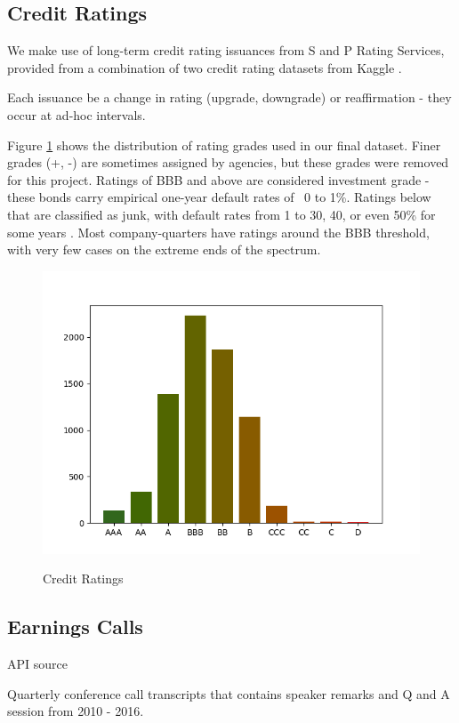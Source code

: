 \documentclass{article}
\begin{document}
    \subsection*{Credit Ratings}

    We make use of long-term credit rating issuances from S and P Rating Services, provided from a combination of two credit rating datasets from Kaggle \citep{gewerc_corporate_2020,makwana_corporate_2022}.

    Each issuance be a change in rating (upgrade, downgrade) or reaffirmation - they occur at ad-hoc intervals.

    Figure \ref{fig:credit-ratings} shows the distribution of rating grades used in our final dataset. Finer grades (+, -) are sometimes assigned by agencies, but these grades were removed for this project. Ratings of BBB and above are considered investment grade - these bonds carry empirical one-year default rates of ~0 to 1\%. Ratings below that are classified as junk, with default rates from 1 to 30, 40, or even 50\% for some years \citep{s_and_p_global_ratings_s_2024}. Most company-quarters have ratings around the BBB threshold, with very few cases on the extreme ends of the spectrum.

    \begin{figure}[h!]
		\centering
        \caption{Credit Ratings}
        \includegraphics[width=0.5\linewidth,keepaspectratio=true]{../Output/All Data EDA/Tabular EDA/Distribution of Rating Issuances_no_title.png}
        \label{fig:credit-ratings}
	\end{figure}

    \subsection*{Earnings Calls}

    API source

    Quarterly conference call transcripts that contains speaker remarks and Q and A session from 2010 - 2016.
\end{document}
